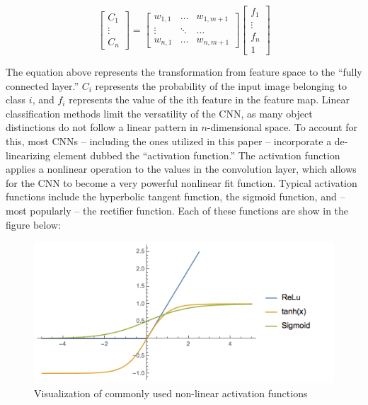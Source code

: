 \documentclass[12pt]{drexelthesis}
\begin{document}
\begin{equation}
\begin{bmatrix}
C_{1} \\
\vdots \\
C_{n}
\end{bmatrix}  =  \begin{bmatrix} w_{1,1} & \hdots & w_{1,m+1} \\ \vdots & \ddots & \hdots \\ w_{n,1} & \hdots & w_{n, m+1} \end{bmatrix}  \begin{bmatrix} f_{1} \\ \vdots \\ f_{n} \\ 1 \end{bmatrix}
\end{equation}

The equation above represents the transformation from feature space to the “fully connected layer.” $C_{i}$ represents the probability of the input image belonging to class $i$, and $f_{i}$ represents the value of the ith feature in the feature map. 
Linear classification methods limit the versatility of the CNN, as many object distinctions do not follow a linear pattern in $n$-dimensional space. To account for this, most CNNs – including the ones utilized in this paper – incorporate a de-linearizing element dubbed the “activation function.” The activation function applies a nonlinear operation to the values in the convolution layer, which allows for the CNN to become a very powerful nonlinear fit function. Typical activation functions include the hyperbolic tangent function, the sigmoid function, and – most popularly – the rectifier function. Each of these functions are show in the figure below:

\begin{figure}[!h]
\centering
\includegraphics[width=5in]{cnnReLu.png}
\caption[Common CNN non-linear activation functions]{\centering Visualization of commonly used non-linear activation functions}
\end{figure}
\end{document}
